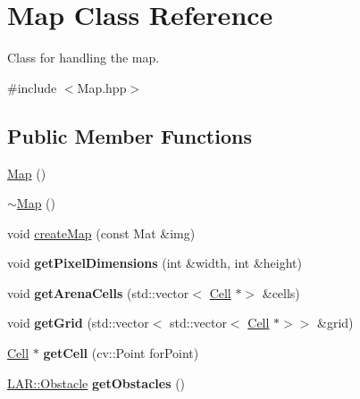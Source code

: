 \hypertarget{class_map}{}\section{Map Class Reference}
\label{class_map}


Class for handling the map.  




{\ttfamily \#include $<$Map.\+hpp$>$}

\subsection*{Public Member Functions}
\begin{DoxyCompactItemize}
\item 
\mbox{\hyperlink{class_map_a0f5ad0fd4563497b4214038cbca8b582}{Map}} ()
\item 
\mbox{\hyperlink{class_map_aa403fbe09394ccf39747588f5168e3b2}{$\sim$\+Map}} ()
\item 
void \mbox{\hyperlink{class_map_a02537656e91e97077dfdfc5d84c3027b}{create\+Map}} (const Mat \&img)
\item 
\mbox{\label{class_map_aaba4246a4400e03db7218828402994df}} 
void {\bfseries get\+Pixel\+Dimensions} (int \&width, int \&height)
\item 
\mbox{\label{class_map_a8eb8b7841ba4ccf02646fe2c288c7fc5}} 
void {\bfseries get\+Arena\+Cells} (std\+::vector$<$ \mbox{\hyperlink{class_cell}{Cell}} $\ast$$>$ \&cells)
\item 
\mbox{\label{class_map_a0bc04be78a3badfaa364bc3f48fbfdfe}} 
void {\bfseries get\+Grid} (std\+::vector$<$ std\+::vector$<$ \mbox{\hyperlink{class_cell}{Cell}} $\ast$$>$$>$ \&grid)
\item 
\mbox{\label{class_map_adf1aceac80d4cbfc91a5cf158c009c9d}} 
\mbox{\hyperlink{class_cell}{Cell}} $\ast$ {\bfseries get\+Cell} (cv\+::\+Point for\+Point)
\item 
\mbox{\label{class_map_a5bb3db6b37f85b3c3c28af7eafdba9f5}} 
\mbox{\hyperlink{class_l_a_r_1_1_obstacle}{L\+A\+R\+::\+Obstacle}} {\bfseries get\+Obstacles} ()
\item 
\mbox{\label{class_map_a8b8801b63526341b3ba9da76d26c539a}} 
$$
\end{DoxyCompactItemize}
